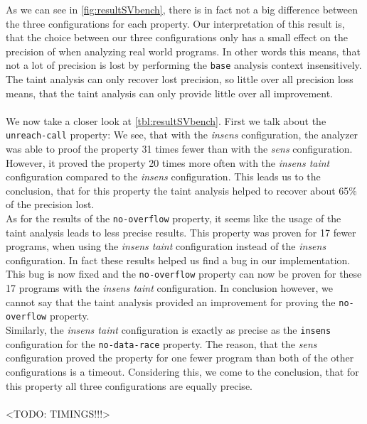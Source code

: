       As we can see in \autoref{fig:resultSVbench}, there is in fact not a big difference between the three configurations for each property. Our interpretation of this result is, that the choice between our three configurations only has a small effect on the precision of \gob when analyzing real world programs. In other words this means, that not a lot of precision is lost by performing the \texttt{base} analysis context insensitively. The taint analysis can only recover lost precision, so little over all precision loss means, that the taint analysis can only provide little over all improvement.\\
      \\
      We now take a closer look at \autoref{tbl:resultSVbench}. First we talk about the \texttt{unreach-call} property: We see, that with the \textit{insens} configuration, the analyzer was able to proof the property 31 times fewer than with the \textit{sens} configuration. However, it proved the property 20 times more often with the \textit{insens taint} configuration compared to the \textit{insens} configuration. This leads us to the conclusion, that for this property the taint analysis helped to recover about 65\% of the precision lost.\\
      As for the results of the \texttt{no-overflow} property, it seems like the usage of the taint analysis leads to less precise results. This property was proven for 17 fewer programs, when using the \textit{insens taint} configuration instead of the \textit{insens} configuration. In fact these results helped us find a bug in our implementation. This bug is now fixed and the \texttt{no-overflow} property can now be proven for these 17 programs with the \textit{insens taint} configuration. In conclusion however, we cannot say that the taint analysis provided an improvement for proving the \texttt{no-overflow} property.\\
      Similarly, the \textit{insens taint} configuration is exactly as precise as the \texttt{insens} configuration for the \texttt{no-data-race} property. The reason, that the \textit{sens} configuration proved the property for one fewer program than both of the other configurations is a timeout. Considering this, we come to the conclusion, that for this property all three configurations are equally precise.\\
      \\
      <TODO: TIMINGS!!!>


